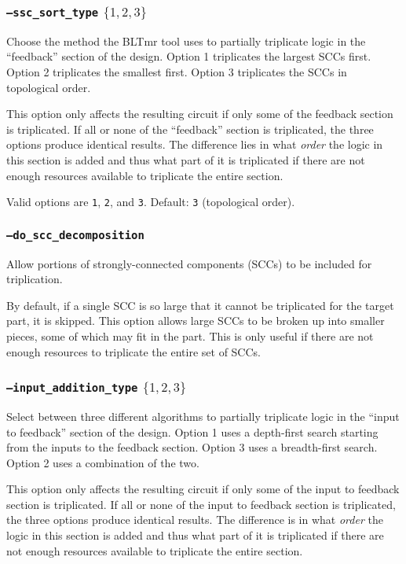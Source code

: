 \subsubsection{\texttt{--ssc\_sort\_type} $\{1,2,3\}$}
Choose the method the BLTmr tool uses to partially triplicate logic in the 
``feedback'' section of the design.  Option 1 triplicates the largest SCCs 
first. Option 2 triplicates the smallest first. Option 3 triplicates the SCCs 
in topological order.

This option only affects the resulting circuit if only some of the feedback 
section is triplicated. If all or none of the ``feedback'' section is 
triplicated, the three options produce identical results. The difference lies 
in what \emph{order} the logic in this section is added and thus what part of 
it is triplicated if there are not enough resources available to triplicate the 
entire section.

Valid options are \texttt{1}, \texttt{2}, and \texttt{3}. Default: \texttt{3}
(topological order).

\subsubsection{\texttt{--do\_scc\_decomposition}}
Allow portions of strongly-connected components (SCCs) to be included for 
triplication. 

By default, if a single SCC is so large that it cannot be triplicated for the 
target part, it is skipped. This option allows large SCCs to be broken up into 
smaller pieces, some of which may fit in the part. This is only useful if there 
are not enough resources to triplicate the entire set of SCCs.

\subsubsection{\texttt{--input\_addition\_type} $\{1,2,3\}$}
Select between three different algorithms to partially triplicate logic in the 
``input to feedback'' section of the design. Option 1 uses a depth-first search 
starting from the inputs to the feedback section. Option 3 uses a breadth-first 
search. Option 2 uses a combination of the two.

This option only affects the resulting circuit if only some of the input
to feedback section is triplicated. If all or none of the input to feedback 
section is triplicated, the three options produce identical results. The 
difference is in what \emph{order} the logic in this section is added and thus 
what part of it is triplicated if there are not enough resources available to 
triplicate the entire section.


